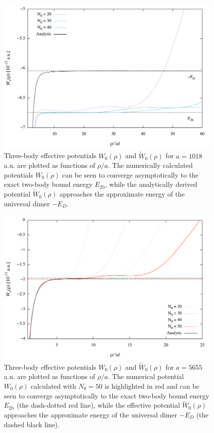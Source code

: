 \begin{figure}[htbp!]
	\includegraphics[width=\linewidth]{twobodyenergy.pdf}
	\caption{Three-body effective potentials $W_0(\rho)$ and $\widetilde{W}_0(\rho)$ for $a=1018$ a.u. are plotted as functions of $\rho/a$. The numerically calculated potentials $W_0(\rho)$ can be seen to converge asymptotically to the exact two-body bound energy $E_{2\mathrm{b}}$, while the analytically derived potential $\widetilde{W}_0(\rho)$ approaches the approximate energy of the universal dimer $-E_D$.}
	\label{fig:twobody}
\end{figure} 

\begin{figure}[!ht]
	\includegraphics[width=\linewidth]{twobodyenergy_5.pdf}
	\caption{Three-body effective potentials $W_0(\rho)$ and $\widetilde{W}_0(\rho)$ for $a=5655$ a.u. are plotted as functions of $\rho/a$. The numerical potential $W_0(\rho)$ calculated with $N_{\theta} = 50$ is highlighted in red and can be seen to converge asymptotically to the exact two-body bound energy $E_{2\mathrm{b}}$ (the dash-dotted red line), while the effective potential $\widetilde{W}_0(\rho)$ approaches the approximate energy of the universal dimer $-E_D$ (the dashed black line).}
	\label{fig:twobody_5}
\end{figure}

